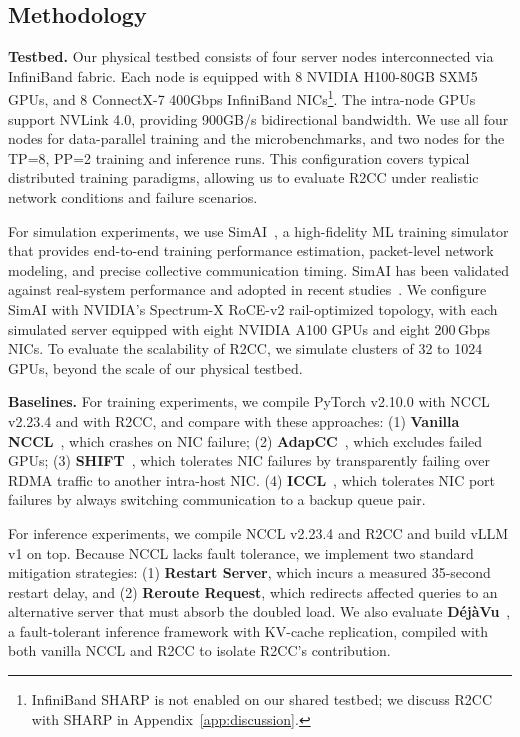 \documentclass[letterpaper,twocolumn,10pt]{article}
\begin{document}
\subsection{Methodology}
\label{sec:setup}
\textbf{Testbed.} Our physical testbed consists of four server nodes interconnected via InfiniBand fabric. Each node is equipped with 8 NVIDIA H100-80GB SXM5 GPUs, and 8 ConnectX-7 400Gbps InfiniBand NICs\footnote{InfiniBand SHARP is not enabled on our shared testbed; we discuss R2CC with SHARP in Appendix~\ref{app:discussion}.}. The intra-node GPUs support NVLink 4.0, providing 900GB/s bidirectional bandwidth. We use all four nodes for data-parallel training and the microbenchmarks, and two nodes for the TP=8, PP=2 training and inference runs. This configuration covers typical distributed training paradigms, allowing us to evaluate R2CC under realistic network conditions and failure scenarios.

For simulation experiments, we use SimAI~\cite{wang2025simai}, a high-fidelity ML training simulator that provides end-to-end training performance estimation, packet-level network modeling, and precise collective communication timing. SimAI has been validated against real-system performance and adopted in recent studies~\cite{qin2025phantora,gui2025accelerating,huang2025netzip}. We configure SimAI with NVIDIA's Spectrum-X RoCE-v2 rail-optimized topology, with each simulated server equipped with eight NVIDIA A100 GPUs and eight 200\,Gbps NICs. To evaluate the scalability of R2CC, we simulate clusters of 32 to 1024 GPUs, beyond the scale of our physical testbed.

\smallskip\noindent\textbf{Baselines.} For training experiments, we compile PyTorch v2.10.0 with NCCL v2.23.4 and with R2CC, and compare with these approaches: (1) {\bf Vanilla NCCL}~\cite{NCCL}, which crashes on NIC failure; (2) {\bf AdapCC}~\cite{zhao2024adapcc}, which excludes failed GPUs; (3) {\bf SHIFT}~\cite{shift}, which tolerates NIC failures by transparently failing over RDMA traffic to another intra-host NIC. (4) {\bf ICCL}~\cite{chen2025efficient}, which tolerates NIC port failures by always switching communication to a backup queue pair.

For inference experiments, we compile NCCL v2.23.4 and R2CC and build vLLM v1 on top. Because NCCL lacks fault tolerance, we implement two standard mitigation strategies: (1) {\bf Restart Server}, which incurs a measured 35-second restart delay, and (2) {\bf Reroute Request}, which redirects affected queries to an alternative server that must absorb the doubled load. We also evaluate {\bf DéjàVu}~\cite{ICML2024}, a fault-tolerant inference framework with KV-cache replication, compiled with both vanilla NCCL and R2CC to isolate R2CC's contribution.
\end{document}
